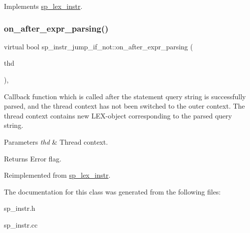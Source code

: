 Implements \mbox{\hyperlink{classsp__lex__instr_acab4e56f638f43101c11f838e1f9d395}{sp\+\_\+lex\+\_\+instr}}.

\mbox{\label{classsp__instr__jump__if__not_af755479ad936f1b382516679a9ed1dcb}} 
\subsubsection{\texorpdfstring{on\+\_\+after\+\_\+expr\+\_\+parsing()}{on\_after\_expr\_parsing()}}
{\footnotesize\ttfamily virtual bool sp\+\_\+instr\+\_\+jump\+\_\+if\+\_\+not\+::on\+\_\+after\+\_\+expr\+\_\+parsing (\begin{DoxyParamCaption}\item[{T\+HD $\ast$}]{thd }\end{DoxyParamCaption})\hspace{0.3cm}{\ttfamily [inline]}, {\ttfamily [virtual]}}

Callback function which is called after the statement query string is successfully parsed, and the thread context has not been switched to the outer context. The thread context contains new L\+EX-\/object corresponding to the parsed query string.


\begin{DoxyParams}{Parameters}
{\em thd} & Thread context.\\
\hline
\end{DoxyParams}
\begin{DoxyReturn}{Returns}
Error flag. 
\end{DoxyReturn}


Reimplemented from \mbox{\hyperlink{classsp__lex__instr_adcace7d5b7daeb393d0592592a2d9d6c}{sp\+\_\+lex\+\_\+instr}}.



The documentation for this class was generated from the following files\+:\begin{DoxyCompactItemize}
\item 
sp\+\_\+instr.\+h\item 
sp\+\_\+instr.\+cc\end{DoxyCompactItemize}
